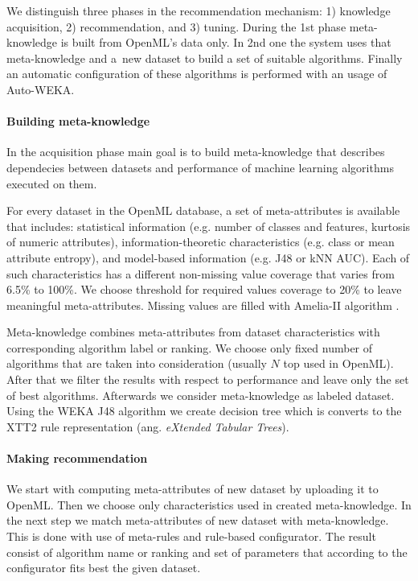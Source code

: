 \documentclass[a4paper]{llncs}
\let\oldparagraph\paragraph
\renewcommand{\paragraph}[1]{\oldparagraph{\textbf{#1}}}
\begin{document}
We distinguish three phases in the recommendation mechanism: 1) knowledge acquisition, 2) recommendation, and 3) tuning. During the 1st phase meta-knowledge is built from OpenML's data only. In 2nd one the system uses that meta-knowledge and a~new dataset to build a set of suitable algorithms. Finally an automatic configuration of these algorithms is performed with an usage of Auto-WEKA.

\vspace{-0.3em}

\paragraph{Building meta-knowledge}

In the acquisition phase main goal is to build meta-knowledge that describes dependecies between datasets and performance of machine learning algorithms executed on them. 

For every dataset in the OpenML database, a set of meta-attributes is available that includes: statistical information  (e.g. number of classes and features, kurtosis of numeric attributes), information-theoretic characteristics (e.g. class or mean attribute entropy), and model-based information (e.g. J48 or kNN AUC). Each of such characteristics has a different non-missing value coverage that varies from 6.5\% to 100\%. We choose threshold for required values coverage to 20\% to leave meaningful meta-attributes. Missing values are filled with Amelia-II algorithm \cite{HonakerKingBlackwell2011}.

Meta-knowledge combines meta-attributes from dataset characteristics with corresponding algorithm label or ranking. We choose only fixed number of algorithms that are taken into consideration (usually $N$ top used in OpenML). After that we filter the results with respect to performance and leave only the set of best algorithms. Afterwards we consider meta-knowledge as labeled dataset. Using the WEKA J48 algorithm we create decision tree which is converts to the XTT2 rule representation (ang. \textit{eXtended Tabular Trees}).

\vspace{-0.3em}

\paragraph{Making recommendation}

We start with computing meta-attributes of new dataset by uploading it to OpenML. Then we choose only characteristics used in created meta-knowledge. In the next step we match meta-attributes of new dataset with meta-knowledge. This is done with use of meta-rules and rule-based configurator. The result consist of algorithm name or ranking and set of parameters that according to the configurator fits best the given dataset.
\end{document}
